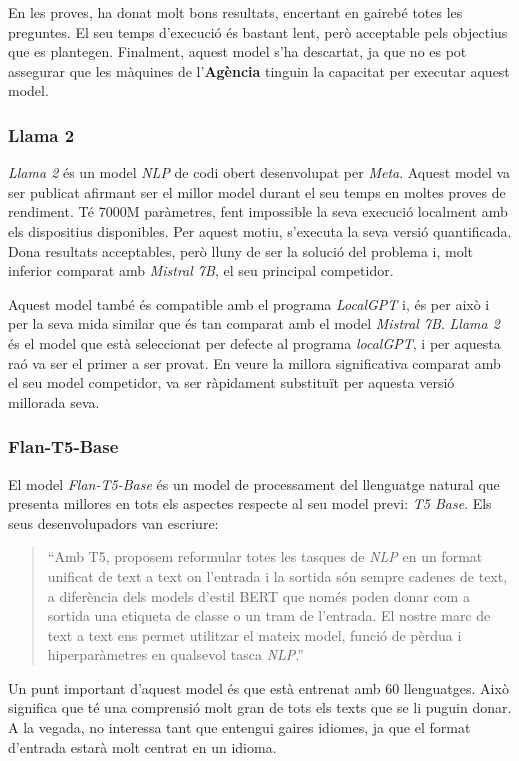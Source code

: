 En les proves, ha donat molt bons resultats, encertant en gairebé totes les preguntes. El seu temps d'execució és bastant lent, però acceptable pels objectius que es plantegen. Finalment, aquest model s'ha descartat, ja que no es pot assegurar que les màquines de l'\textbf{Agència} tinguin la capacitat per executar aquest model.


\subsubsection{Llama 2}
\textit{Llama 2} \cite{llama} és un model \textit{NLP} de codi obert desenvolupat per \textit{Meta}. Aquest model va ser publicat afirmant ser el millor model durant el seu temps en moltes proves de rendiment. Té 7000M paràmetres, fent impossible la seva execució localment amb els dispositius disponibles. Per aquest motiu, s'executa la seva versió quantificada. Dona resultats acceptables, però lluny de ser la solució del problema i, molt inferior comparat amb \textit{Mistral 7B}, el seu principal competidor.

Aquest model també és compatible amb el programa \textit{LocalGPT} \cite{localgpt} i, és per això i per la seva mida similar que és tan comparat amb el model \textit{Mistral 7B}. \textit{Llama 2} és el model que està seleccionat per defecte al programa \textit{localGPT}, i per aquesta raó va ser el primer a ser provat. En veure la millora significativa comparat amb el seu model competidor, va ser ràpidament substituït per aquesta versió millorada seva.


\subsubsection{Flan-T5-Base}
El model \textit{Flan-T5-Base} \cite{flan-t5} és un model de processament del llenguatge natural que presenta millores en tots els aspectes respecte al seu model previ: \textit{T5 Base}. Els seus desenvolupadors van escriure: 
\begin{quote}
``Amb T5, proposem reformular totes les tasques de \textit{NLP} en un format unificat de text a text on l'entrada i la sortida són sempre cadenes de text, a diferència dels models d'estil BERT que només poden donar com a sortida una etiqueta de classe o un tram de l'entrada. El nostre marc de text a text ens permet utilitzar el mateix model, funció de pèrdua i hiperparàmetres en qualsevol tasca \textit{NLP}.''
\end{quote}

Un punt important d'aquest model és que està entrenat amb 60 llenguatges. Això significa que té una comprensió molt gran de tots els texts que se li puguin donar. A la vegada, no interessa tant que entengui gaires idiomes, ja que el format d'entrada estarà molt centrat en un idioma.

